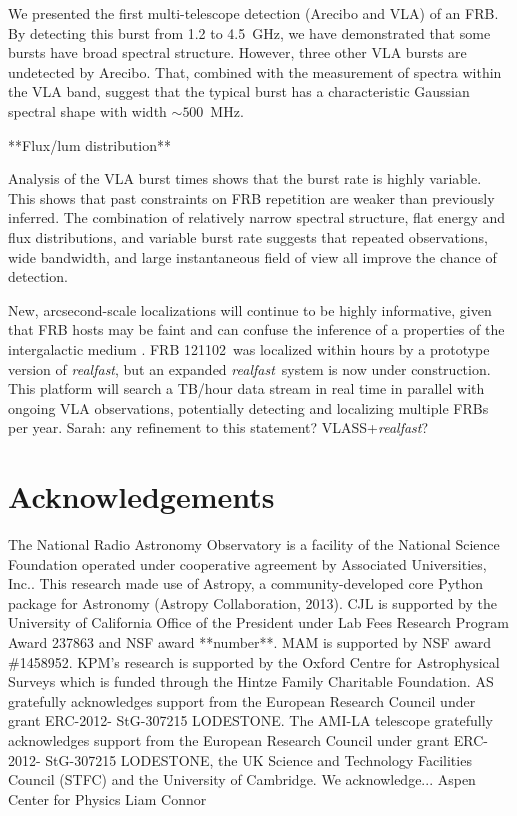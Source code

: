 \documentclass[twocolumn]{aastex61}
\newcommand{\rf}{\emph{realfast}}
\newcommand{\frb}{FRB 121102}
\begin{document}
We presented the first multi-telescope detection (Arecibo and VLA) of an FRB. By detecting this burst from 1.2 to 4.5~GHz, we have demonstrated that some bursts have broad spectral structure. However, three other VLA bursts are undetected by Arecibo. That, combined with the measurement of spectra within the VLA band, suggest that the typical burst has a characteristic Gaussian spectral shape with width $\sim500$\ MHz.

**Flux/lum distribution**

Analysis of the VLA burst times shows that the burst rate is highly variable. This shows that past constraints on FRB repetition are weaker than previously inferred. The combination of relatively narrow spectral structure, flat energy and flux distributions, and variable burst rate suggests that repeated observations, wide bandwidth, and large instantaneous field of view all improve the chance of detection. 

New, arcsecond-scale localizations will continue to be highly informative, given that FRB hosts may be faint and can confuse the inference of a properties of the intergalactic medium \citep{2014ApJ...783L..35D}. \frb\ was localized within hours by a prototype version of \rf, but an expanded \rf\ system is now under construction. This platform will search a TB/hour data stream in real time in parallel with ongoing VLA observations, potentially detecting and localizing multiple FRBs per year. {\color{red} Sarah: any refinement to this statement?} VLASS+\rf?



\section*{Acknowledgements}
The National Radio Astronomy Observatory is a facility of the National Science Foundation operated under cooperative agreement by Associated Universities, Inc..
This research made use of Astropy, a community-developed core Python package for Astronomy (Astropy Collaboration, 2013).
CJL is supported by the University of California Office of the President under Lab Fees Research Program Award 237863 and NSF award **number**.
MAM is supported by NSF award \#1458952. 
KPM's research is supported by the Oxford Centre for Astrophysical Surveys which is funded through the Hintze Family Charitable Foundation. AS gratefully acknowledges support from the European Research Council under grant ERC-2012- StG-307215 LODESTONE. The AMI-LA telescope gratefully acknowledges support from the European Research Council under grant ERC-2012- StG-307215 LODESTONE, the UK Science and Technology Facilities Council (STFC) and the University of Cambridge.
We acknowledge...
Aspen Center for Physics
Liam Connor
\end{document}
